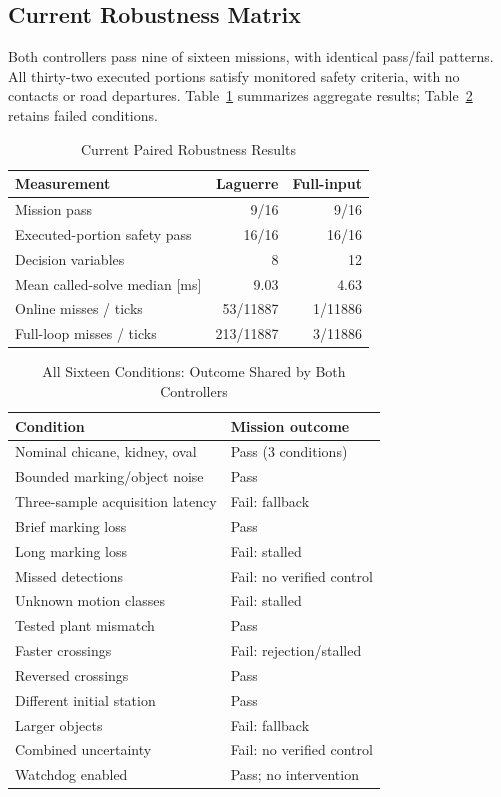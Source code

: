 \documentclass[conference]{IEEEtran}
\begin{document}
\subsection{Current Robustness Matrix}
Both controllers pass nine of sixteen missions, with identical pass/fail
patterns. All thirty-two executed portions satisfy monitored safety criteria,
with no contacts or road departures. Table~\ref{tab:current} summarizes
aggregate results; Table~\ref{tab:cases} retains failed conditions.

\begin{table}[t]
\caption{Current Paired Robustness Results}
\label{tab:current}
\centering
\begin{tabular}{lrr}
\toprule
Measurement & Laguerre & Full-input\\
\midrule
Mission pass & 9/16 & 9/16\\
Executed-portion safety pass & 16/16 & 16/16\\
Decision variables & 8 & 12\\
Mean called-solve median [ms] & 9.03 & 4.63\\
Online misses / ticks & 53/11887 & 1/11886\\
Full-loop misses / ticks & 213/11887 & 3/11886\\
\bottomrule
\end{tabular}
\end{table}

\begin{table}[t]
\caption{All Sixteen Conditions: Outcome Shared by Both Controllers}
\label{tab:cases}
\centering
\begin{tabular}{ll}
\toprule
Condition & Mission outcome\\
\midrule
Nominal chicane, kidney, oval & Pass (3 conditions)\\
Bounded marking/object noise & Pass\\
Three-sample acquisition latency & Fail: fallback\\
Brief marking loss & Pass\\
Long marking loss & Fail: stalled\\
Missed detections & Fail: no verified control\\
Unknown motion classes & Fail: stalled\\
Tested plant mismatch & Pass\\
Faster crossings & Fail: rejection/stalled\\
Reversed crossings & Pass\\
Different initial station & Pass\\
Larger objects & Fail: fallback\\
Combined uncertainty & Fail: no verified control\\
Watchdog enabled & Pass; no intervention\\
\bottomrule
\end{tabular}
\end{table}
\end{document}
